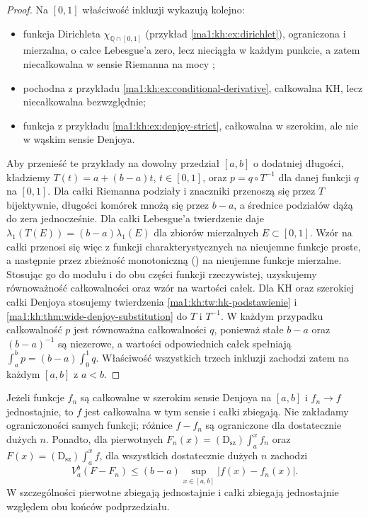\begin{proof}
Na $[0,1]$ właściwość inkluzji wykazują kolejno:
\begin{itemize}
\item funkcja Dirichleta $\chi_{\mathbb Q\cap[0,1]}$
  (przykład \ref{ma1:kh:ex:dirichlet}), ograniczona
  i mierzalna, o całce Lebesgue'a zero, lecz nieciągła
  w każdym punkcie, a zatem niecałkowalna w sensie
  Riemanna na mocy
  ;
\item pochodna z przykładu
  \ref{ma1:kh:ex:conditional-derivative}, całkowalna KH,
  lecz niecałkowalna bezwzględnie;
\item funkcja z przykładu \ref{ma1:kh:ex:denjoy-strict},
  całkowalna w szerokim, ale nie w wąskim sensie Denjoya.
\end{itemize}
Aby przenieść te przykłady na dowolny przedział $[a,b]$
o dodatniej długości, kładziemy $T(t)=a+(b-a)t$,
$t\in[0,1]$, oraz $p=q\circ T^{-1}$ dla danej
funkcji $q$ na $[0,1]$. Dla całki Riemanna podziały
i znaczniki przenoszą się przez $T$ bijektywnie,
długości komórek mnożą się przez $b-a$, a średnice
podziałów dążą do zera jednocześnie.
Dla całki Lebesgue'a twierdzenie
daje $\lambda_1(T(E))=(b-a)\lambda_1(E)$
dla zbiorów mierzalnych $E\subset[0,1]$.
Wzór na całki przenosi się więc z funkcji
charakterystycznych na nieujemne funkcje proste,
a następnie przez zbieżność monotoniczną
() na nieujemne funkcje
mierzalne. Stosując go do modułu i do obu części
funkcji rzeczywistej, uzyskujemy równoważność
całkowalności oraz wzór na wartości całek.
Dla KH oraz szerokiej całki Denjoya stosujemy
twierdzenia \ref{ma1:kh:tw:hk-podstawienie}
i \ref{ma1:kh:thm:wide-denjoy-substitution}
do $T$ i $T^{-1}$.
W każdym przypadku całkowalność $p$ jest równoważna
całkowalności $q$, ponieważ stałe $b-a$ oraz $(b-a)^{-1}$
są niezerowe, a wartości odpowiednich całek spełniają
$\int_a^b p=(b-a)\int_0^1 q$.
Właściwość wszystkich trzech inkluzji zachodzi zatem
na każdym $[a,b]$ z $a<b$.
\end{proof}
\begin{wniosek}\label{ma1:kh:cor:wide-denjoy-uniform}
Jeżeli funkcje $f_n$ są całkowalne w szerokim sensie Denjoya na $[a,b]$ i $f_n\to f$ jednostajnie, to $f$ jest całkowalna w tym sensie i całki zbiegają. Nie zakładamy ograniczoności samych funkcji; różnice $f-f_n$ są ograniczone dla dostatecznie dużych $n$. Ponadto, dla pierwotnych
$F_n(x)=(\mathrm D_{\mathrm{sz}})\int_a^x f_n$ oraz
$F(x)=(\mathrm D_{\mathrm{sz}})\int_a^x f$, dla wszystkich
dostatecznie dużych $n$ zachodzi
\[
 V_a^b(F-F_n)\le (b-a)\sup_{x\in[a,b]}|f(x)-f_n(x)|.
\]
W szczególności pierwotne zbiegają jednostajnie i
całki zbiegają jednostajnie względem obu końców podprzedziału.
\end{wniosek}
